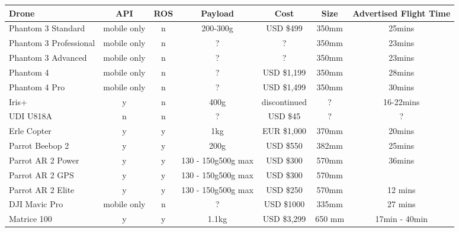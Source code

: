 \documentclass[capstone_report.tex]{subfiles}
\begin{document}
\pagebreak
\begin{landscape}
\thispagestyle{empty}
\begin{table}[H]
\centering
\begin{tabular}{@{}lcccccc@{}}
\toprule
Drone                  & API         & ROS & Payload            & Cost         & Size   & Advertised Flight Time  \\ \midrule
Phantom 3 Standard     & mobile only & n   & 200-300g           & USD \$499    & 350mm  & 25mins     \\
Phantom 3 Professional & mobile only & n   & ?                  & ?            & 350mm  & 23mins                 \\
Phantom 3 Advanced     & mobile only & n   & ?                  & ?            & 350mm  & 23mins                     \\
Phantom 4              & mobile only & n   & ?                  & USD \$1,199  & 350mm  & 28mins                   \\
Phantom 4 Pro          & mobile only & n   & ?                  & USD \$1,499  & 350mm  & 30mins                    \\
Iris+                  & y           & n   & 400g               & discontinued & ?      & 16-22mins                  \\
UDI U818A              & n           & n   & ?                  & USD \$45     & ?      & ?                               \\
Erle Copter            & y           & y   & 1kg                & EUR \$1,000  & 370mm  & 20mins                       \\
Parrot Beebop 2        & y           & y   & 200g               & USD \$550    & 382mm  & 25mins                        \\
Parrot AR 2 Power      & y           & y   & 130 - 150g500g max & USD \$300      & 570mm  & 36mins                        \\
Parrot AR 2 GPS        & y           & y   & 130 - 150g500g max & USD \$300      & 570mm  &                                 \\
Parrot AR 2 Elite      & y           & y   & 130 - 150g500g max & USD \$250      & 570mm  & 12 mins                        \\
DJI Mavic Pro          & mobile only & n   & ?                  & USD \$1000     & 335mm  & 27 mins                         \\
Matrice 100            & y           & y   & 1.1kg              & USD \$3,299  & 650 mm & 17min - 40min             \\

\end{tabular}
\end{table}
\end{landscape}
\end{document}
